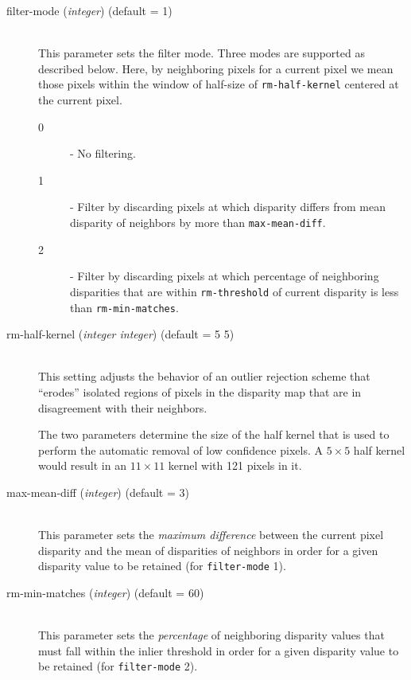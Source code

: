 \begin{description}

\item[filter-mode \textnormal{\small{(\emph{integer})}} (default = 1)]
\hfill \\ This parameter sets the filter mode. Three modes are supported
as described below. Here, by neighboring pixels for a current pixel we
mean those pixels within the window of half-size of
\texttt{rm-half-kernel} centered at the current pixel.
  \begin{description}
    \item[0] - No filtering.
    \item[1] - Filter by discarding pixels at which disparity differs from mean disparity of neighbors by more than \texttt{max-mean-diff}.
    \item[2] - Filter by discarding pixels at which percentage of neighboring disparities that are within \texttt{rm-threshold} of current disparity is less than \texttt{rm-min-matches}.
  \end{description}

\item[rm-half-kernel \textnormal{\small{(\emph{integer integer})}} (default = 5 5)] \hfill \\
  This setting adjusts the behavior of an outlier rejection scheme
  that ``erodes'' isolated regions of pixels in the disparity map that
  are in disagreement with their neighbors.

  The two parameters determine the size of the half kernel that is
  used to perform the automatic removal of low confidence pixels.  A
  $5 \times 5$ half kernel would result in an $11 \times 11$ kernel
  with 121 pixels in it.

\item[max-mean-diff \textnormal{\small{(\emph{integer})}} (default = 3)] \hfill \\
  This parameter sets the {\em maximum difference} between the current pixel disparity and the mean of disparities of neighbors in order for a
  given disparity value to be retained (for \texttt{filter-mode} 1).

\item[rm-min-matches \textnormal{\small{(\emph{integer})}} (default = 60)] \hfill \\
  This parameter sets the {\em percentage} of neighboring disparity
  values that must fall within the inlier threshold in order for a
  given disparity value to be retained (for \texttt{filter-mode} 2).


\end{description}
